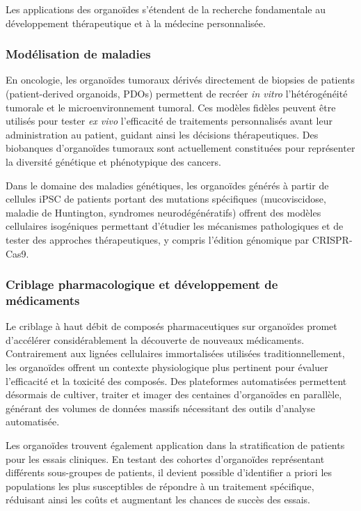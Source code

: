Les applications des organoïdes s'étendent de la recherche fondamentale au développement thérapeutique et à la médecine personnalisée.

\subsubsection{Modélisation de maladies}

En oncologie, les organoïdes tumoraux dérivés directement de biopsies de patients (patient-derived organoids, PDOs) permettent de recréer \textit{in vitro} l'hétérogénéité tumorale et le microenvironnement tumoral. Ces modèles fidèles peuvent être utilisés pour tester \textit{ex vivo} l'efficacité de traitements personnalisés avant leur administration au patient, guidant ainsi les décisions thérapeutiques. Des biobanques d'organoïdes tumoraux sont actuellement constituées pour représenter la diversité génétique et phénotypique des cancers.

Dans le domaine des maladies génétiques, les organoïdes générés à partir de cellules iPSC de patients portant des mutations spécifiques (mucoviscidose, maladie de Huntington, syndromes neurodégénératifs) offrent des modèles cellulaires isogéniques permettant d'étudier les mécanismes pathologiques et de tester des approches thérapeutiques, y compris l'édition génomique par CRISPR-Cas9.

\subsubsection{Criblage pharmacologique et développement de médicaments}

Le criblage à haut débit de composés pharmaceutiques sur organoïdes promet d'accélérer considérablement la découverte de nouveaux médicaments. Contrairement aux lignées cellulaires immortalisées utilisées traditionnellement, les organoïdes offrent un contexte physiologique plus pertinent pour évaluer l'efficacité et la toxicité des composés. Des plateformes automatisées permettent désormais de cultiver, traiter et imager des centaines d'organoïdes en parallèle, générant des volumes de données massifs nécessitant des outils d'analyse automatisée.

Les organoïdes trouvent également application dans la stratification de patients pour les essais cliniques. En testant des cohortes d'organoïdes représentant différents sous-groupes de patients, il devient possible d'identifier a priori les populations les plus susceptibles de répondre à un traitement spécifique, réduisant ainsi les coûts et augmentant les chances de succès des essais.

